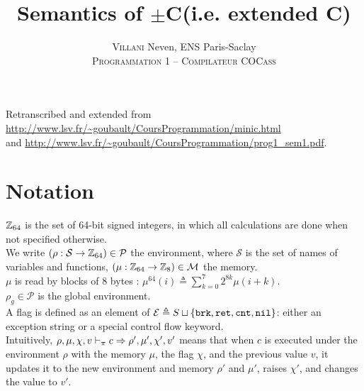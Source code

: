 

\newcommand{\Cmp}{\(\pm\)C}
\newcommand{\Cmm}{C\textminus\textminus}
\newcommand{\fun}{\text{fun}_\pi^n}
\newcommand{\fnptr}{\text{fun}_\mu^n}
\newcommand{\gives}{\vdash_\pi}
\newcommand{\brk}{\t{brk}}
\newcommand{\ret}{\t{ret}}
\newcommand{\cnt}{\t{cnt}}
\newcommand{\nil}{\t{nil}}

\title{Semantics of \Cmp (i.e. extended \Cmm)}
\author{\textsc{Villani} Neven, ENS Paris-Saclay\\\textsc{Programmation 1 -- Compilateur COCass}}


\maketitle

Retranscribed and extended from \url{http://www.lsv.fr/~goubault/CoursProgrammation/minic.html}\\
and \url{http://www.lsv.fr/~goubault/CoursProgrammation/prog1_sem1.pdf}.\\


\section*{Notation}

\(\mathbb{Z}_{64}\) is the set of 64-bit signed integers, in which all calculations are done when not specified otherwise.\\

We write \((\rho: \mathcal{S}\to\mathbb{Z}_{64})\in \mathcal{P}\) the environment, where \(\mathcal{S}\) is the set of names of variables and functions, \((\mu: \mathbb{Z}_{64}\to\mathbb{Z}_{8})\in \mathcal{M}\) the memory.\\
\(\mu\) is read by blocks of 8 bytes : \(\mu^{64}(i) \triangleq \sum_{k=0}^7 2^{8k}\mu(i+k)\).\\
\(\rho_g\in\mathcal{P}\) is the global environment.\\

A flag is defined as an element of \(\mathcal{E} \triangleq S \sqcup \{ \brk, \ret, \cnt, \nil \}\): either an exception string or a special control flow keyword.\\
Intuitively, \(\rho,\mu,\chi,v \gives c \tto \rho',\mu',\chi',v'\) means that when \(c\) is executed under the environment \(\rho\) with the memory \(\mu\), the flag \(\chi\), and the previous value \(v\), it updates it to the new environment and memory \(\rho'\) and \(\mu'\), raises \(\chi'\), and changes the value to \(v'\).\\


